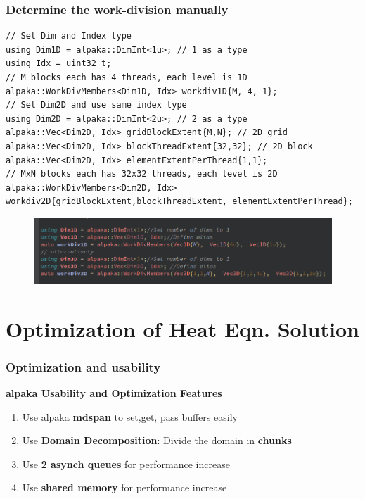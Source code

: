 \documentclass[9pt]{beamer}
\begin{document}
\begin{frame}[fragile]
\frametitle{Determine the work-division manually}
\begin{lstlisting}
// Set Dim and Index type
using Dim1D = alpaka::DimInt<1u>; // 1 as a type
using Idx = uint32_t;
// M blocks each has 4 threads, each level is 1D
alpaka::WorkDivMembers<Dim1D, Idx> workdiv1D{M, 4, 1};
// Set Dim2D and use same index type
using Dim2D = alpaka::DimInt<2u>; // 2 as a type
alpaka::Vec<Dim2D, Idx> gridBlockExtent{M,N}; // 2D grid
alpaka::Vec<Dim2D, Idx> blockThreadExtent{32,32}; // 2D block
alpaka::Vec<Dim2D, Idx> elementExtentPerThread{1,1};
// MxN blocks each has 32x32 threads, each level is 2D
alpaka::WorkDivMembers<Dim2D, Idx> workdiv2D{gridBlockExtent,blockThreadExtent, elementExtentPerThread};
\end{lstlisting}
\begin{figure}
    \centering
    \includegraphics[width=0.75\linewidth]{workdivManual.png}
\end{figure}

\end{frame}

\section{Optimization of Heat Eqn. Solution}

\begin{frame}
\frametitle{Optimization and usability}
\begin{center}
      \Huge \textbf{alpaka Usability and Optimization Features}
  \end{center}
\begin{enumerate}
 \item Use alpaka \textbf{mdspan} to set,get, pass buffers easily
 \item Use \textbf{Domain Decomposition}: Divide the domain in \textbf{chunks}
 \item Use \textbf{2 asynch queues} for performance increase
 \item Use \textbf{shared memory} for performance increase
\end{enumerate}
    \end{frame}
\end{document}
